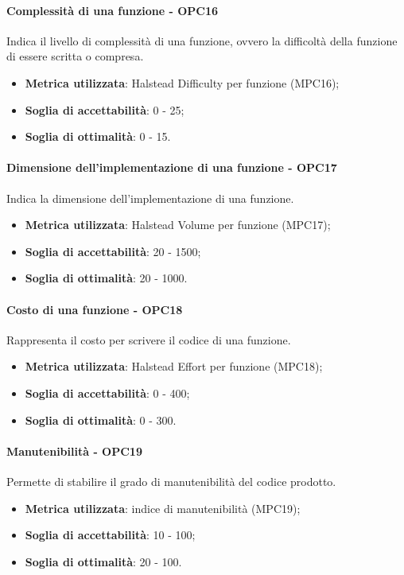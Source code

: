 \documentclass[PdQ.tex]{subfiles}
\begin{document}
			\paragraph{Complessità di una funzione - OPC16}
				Indica il livello di complessità di una funzione, ovvero la difficoltà della funzione di essere scritta o compresa.
				\begin{itemize}
					\item \textbf{Metrica utilizzata}: Halstead Difficulty per funzione (MPC16);
					\item \textbf{Soglia di accettabilità}: 0 - 25;
					\item \textbf{Soglia di ottimalità}: 0 - 15.
				\end{itemize}
			
			\paragraph{Dimensione dell'implementazione di una funzione - OPC17}
				Indica la dimensione dell'implementazione di una funzione.
				\begin{itemize}
					\item \textbf{Metrica utilizzata}: Halstead Volume per funzione (MPC17);
					\item \textbf{Soglia di accettabilità}: 20 - 1500;
					\item \textbf{Soglia di ottimalità}: 20 - 1000.
				\end{itemize}
				
			\paragraph{Costo di una funzione - OPC18}
				Rappresenta il costo per scrivere il codice di una funzione.
				\begin{itemize}
					\item \textbf{Metrica utilizzata}: Halstead Effort per funzione (MPC18);
					\item \textbf{Soglia di accettabilità}: 0 - 400;
					\item \textbf{Soglia di ottimalità}: 0 - 300.
				\end{itemize}
				
			\paragraph{Manutenibilità - OPC19}
				Permette di stabilire il grado di manutenibilità del codice prodotto.
				\begin{itemize}
					\item \textbf{Metrica utilizzata}: indice di manutenibilità (MPC19);
					\item \textbf{Soglia di accettabilità}: 10 - 100;
					\item \textbf{Soglia di ottimalità}: 20 - 100.
				\end{itemize}
		
\end{document}
